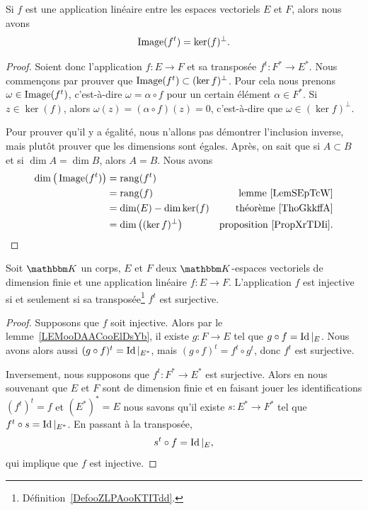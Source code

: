 \begin{proposition}        \label{PropWOPIooBHFDdP}
    Si \( f\) est une application linéaire entre les espaces vectoriels \( E\) et \( F\), alors nous avons
    \begin{equation}
        \operatorname{Image}(f^t)=\ker(f)^{\perp}.
    \end{equation}
\end{proposition}

\begin{proof}
    Soient donc l'application \( f\colon E\to F\) et sa transposée \( f^t\colon F^*\to E^*\). Nous commençons par prouver que \( \operatorname{Image}(f^{t})\subset(\ker f)^{\perp}\). Pour cela nous prenons \( \omega\in \operatorname{Image}(f^t)\), c'est-à-dire \( \omega=\alpha\circ f\) pour un certain élément \( \alpha\in F^*\). Si \( z\in\ker(f)\), alors \( \omega(z)=(\alpha\circ f)(z)=0\), c'est-à-dire que \( \omega\in (\ker f)^{\perp}\).

    Pour prouver qu'il y a égalité, nous n'allons pas démontrer l'inclusion inverse, mais plutôt prouver que les dimensions sont égales. Après, on sait que si \( A\subset B\) et si \( \dim A=\dim B\), alors \( A=B\). Nous avons
    \begin{subequations}
        \begin{align}
            \dim\big( \operatorname{Image}(f^t) \big)&=\operatorname{rang}(f^t)\\
            &=\operatorname{rang}(f)  &\text{lemme~\ref{LemSEpTcW}}\\
            &=\dim(E)-\dim\ker(f)   &\text{théorème~\ref{ThoGkkffA}}\\
            &=\dim\big( (\ker f)^{\perp} \big)  &\text{proposition~\ref{PropXrTDIi}}.
        \end{align}
    \end{subequations}
\end{proof}

\begin{lemma}
    Soit \( \eK\) un corps, \( E\) et \( F\) deux \( \eK\)-espaces vectoriels de dimension finie et une application linéaire \( f\colon E\to F\). L'application \( f\) est injective si et seulement si sa transposée\footnote{Définition~\ref{DefooZLPAooKTITdd}.} \( f^t\) est surjective.
\end{lemma}

\begin{proof}
    Supposons que \( f\) soit injective. Alors par le lemme~\ref{LEMooDAACooElDsYb}, il existe \( g\colon F\to E\) tel que \( g\circ f=\operatorname{Id}|_E\). Nous avons alors aussi \( (g\circ f)^t=\operatorname{Id}|_{E^*}\), mais \( (g\circ f)^t=f^t\circ g^t\), donc \( f^t\) est surjective.

    Inversement, nous supposons que \( f^t\colon F^*\to E^*\) est surjective. Alors en nous souvenant que \( E\) et \( F\) sont de dimension finie et en faisant jouer les identifications \( (f^t)^t=f\) et \( (E^*)^*=E\) nous savons qu'il existe \( s\colon E^*\to F^*\) tel que \( f^t\circ s=\operatorname{Id}|_{E^*}\). En passant à la transposée,
    \begin{equation}
        s^t\circ f=\operatorname{Id}|_{E},
    \end{equation}
    qui implique que \( f\) est injective.
\end{proof}

